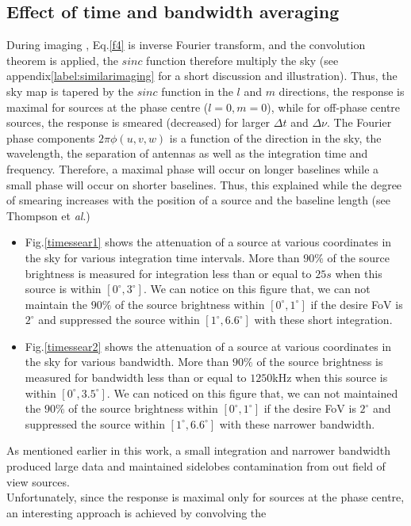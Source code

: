 \documentclass[useAMS,usenatbib]{mn2e}
\begin{document}
\subsection{Effect of time and bandwidth averaging}
During imaging \citep{Marti2008}, Eq.\ref{f4} is inverse Fourier transform, and the convolution theorem is applied, the 
$sinc$ function therefore multiply the sky (see appendix\ref{label:similarimaging} for a short discussion and illustration). Thus, the 
sky map is tapered by the $sinc$ function in the $l$ and $m$ directions, the response is maximal for sources at the phase centre 
($l=0,m=0$), while for off-phase centre sources, the response is smeared (decreased) for larger $\Delta t$ and $\Delta \nu$. The 
Fourier phase components $2\pi \phi(u,v,w)$ is a function of the direction in the sky, the wavelength, the separation of antennas as well 
as the integration time and frequency. Therefore, a maximal phase will occur on longer baselines while a small phase will occur on shorter 
baselines. 
Thus, this explained while the degree of smearing increases with the position of a source and the baseline length (see Thompson 
et \textit{al}.)
\begin{itemize}
 \item Fig.\ref{timessear1} shows the attenuation of a source at various coordinates in the sky for various integration time intervals. 
More than $90\%$ of the source brightness is measured for integration less than or equal to $25s$ when this source is within 
$[0^\circ,3^\circ]$. We can notice on this figure that, we can not maintain the $90\%$ of the source brightness within 
$[0^\circ,1^\circ]$ if the desire FoV is $2^\circ$ and suppressed the source within $[1^\circ,6.6^\circ]$ with these short integration.
  \item Fig.\ref{timessear2} shows the attenuation of a source at various coordinates in the sky for various bandwidth. More than $90\%$ of 
the source brightness is measured for bandwidth less than or equal to $1250$kHz when this source is within 
$[0^\circ,3.5^\circ]$. We can noticed on this figure that, we can not maintained the $90\%$ of the source brightness within 
$[0^\circ,1^\circ]$ if the desire FoV is $2^\circ$ and suppressed the source within $[1^\circ,6.6^\circ]$ with these narrower bandwidth.
\end{itemize}
As mentioned earlier in this work, a small integration and narrower bandwidth produced large data and maintained sidelobes contamination 
from out field of view sources.\\
Unfortunately, since the response is maximal only for sources at the phase centre, an interesting approach is achieved by convolving the 
\end{document}
